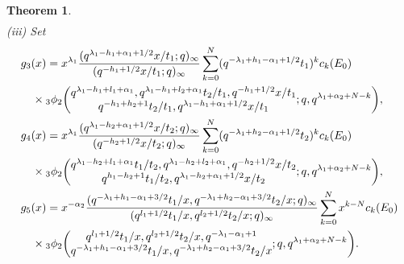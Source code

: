 \documentclass[10pt,a4paper]{amsart}
\newtheorem{thm}{Theorem}
\begin{document}
\begin{thm}
\begin{align*}
  \end{align*}
(iii) Set
\begin{align*}
& g_{3}(x) = x^{ \lambda _{1} } \frac{( q^{ \lambda _{1} - h_{1} + \alpha _{1} + 1/2}x/t_{1}; q)_\infty}{( q^{-h_{1} + 1/2}x/t_{1}; q)_\infty}  \sum_{k = 0}^{N} (q^{- \lambda _{1} + h_{1}  - \alpha _{1} + 1/2}t_{1})^k c_{k} (E_{0})  \notag \\
  &\quad \times {}_3\phi_2 \biggl( \begin{array}{@{}c@{}} q^{ \lambda _{1} -h_{1} + l_{1} + \alpha _{1} }, q^{ \lambda _{1} -h_{1} + l_{2} + \alpha _{1} }t_{2}/t_{1}, q^{-h_{1} + 1/2}x/t_{1} \\
     q^{- h_{1} + h_{2} + 1}t_{2}/t_{1}, q^{ \lambda _{1} - h_{1} + \alpha _{1} + 1/2}x/t_{1} \end{array} ;q,q^{ \lambda _{1}  + \alpha_{2} +N  - k} \biggr), \\
  &  g_{4}(x) = x^{ \lambda _{1} } \frac{( q^{ \lambda _{1} - h_{2} + \alpha _{1} + 1/2}x/t_{2}; q)_\infty}{( q^{-h_{2} + 1/2}x/t_{2}; q)_\infty}  \sum_{k = 0}^{N}  (q^{- \lambda _{1} +h_{2} - \alpha _{1} + 1/2}t_{2})^k c_{k} (E_{0}) \notag \\
  &\quad \times {}_3\phi_2 \biggl( \begin{array}{@{}c@{}} q^{ \lambda _{1} -h_{2} + l_{1} + \alpha _{1} }t_{1}/t_{2}, q^{ \lambda _{1} -h_{2} + l_{2} + \alpha _{1} }, q^{-h_{2} + 1/2}x/t_{2} \\
     q^{h_{1} - h_{2} + 1}t_{1}/t_{2}, q^{ \lambda _{1} - h_{2} + \alpha _{1} + 1/2}x/t_{2} \end{array} ;q,q^{ \lambda _{1}  + \alpha_{2} +N - k} \biggr), \\
 & g_{5}(x) = x^{ - \alpha_{2} } \frac{(q^{- \lambda _{1} + h_{1} - \alpha _{1} + 3/2}t_{1}/x, q^{- \lambda _{1} + h_{2} - \alpha _{1} + 3/2}t_{2}/x ; q)_{\infty}}{(q^{l_{1} + 1/2}t_{1}/x, q^{l_{2} + 1/2}t_{2}/x ; q)_{\infty}} \sum_{k = 0}^{N} x^{k-N} c_{k}  (E_{0}) \notag \\
  &\quad \times  {}_3\phi_2 \biggl( \begin{array}{@{}c@{}} q^{l_{1} + 1/2}t_{1}/x, q^{l_{2} + 1/2}t_{2}/x, q^{- \lambda _{1} - \alpha _{1} + 1} \\
     q^{- \lambda _{1} + h_{1} - \alpha _{1} + 3/2}t_{1}/x, q^{- \lambda _{1} + h_{2} - \alpha _{1} + 3/2}t_{2}/x \end{array} ;q,q^{ \lambda _{1}  + \alpha_{2} +N - k} \biggr).

\end{align*}
\end{thm}
\end{document}
